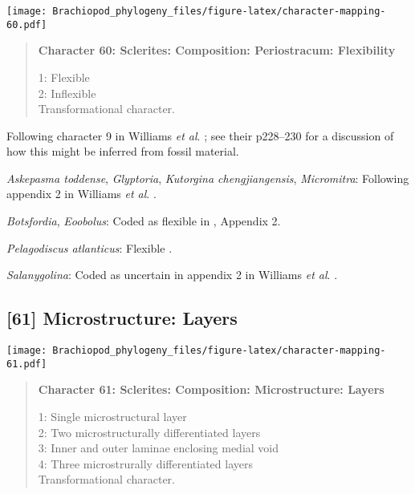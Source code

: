 \documentclass[openany]{book}
\theoremstyle{definition}
\theoremstyle{definition}
\theoremstyle{definition}
\theoremstyle{remark}
\begin{document}
\texttt{[image: Brachiopod\_phylogeny\_files/figure-latex/character-mapping-60.pdf]}

\begin{quote}
\textbf{Character 60: Sclerites: Composition: Periostracum: Flexibility}

1: Flexible\\
2: Inflexible\\
Transformational character.
\end{quote}

Following character 9 in Williams \emph{et al}.
\citeyearpar{Williams1998Thediversity}; see their p228--230 for a
discussion of how this might be inferred from fossil material.

\hypertarget{Askepasma_toddense-coding-60}{}
\emph{Askepasma toddense}, \emph{Glyptoria}, \emph{Kutorgina
chengjiangensis}, \emph{Micromitra}: Following appendix 2 in Williams
\emph{et al}. \citeyearpar{Williams1998Thediversity}.

\hypertarget{Botsfordia-coding-60}{}
\emph{Botsfordia}, \emph{Eoobolus}: Coded as flexible in
\citet{Williams1998Thediversity}, Appendix 2.

\hypertarget{Pelagodiscus_atlanticus-coding-60}{}
\emph{Pelagodiscus atlanticus}: Flexible
\citep{Williams1998Thediversity}.

\hypertarget{Salanygolina-coding-60}{}
\emph{Salanygolina}: Coded as uncertain in appendix 2 in Williams
\emph{et al}. \citeyearpar{Williams1998Thediversity}.

\subsection*{{[}61{]} Microstructure:
Layers}\label{microstructure-layers}

\texttt{[image: Brachiopod\_phylogeny\_files/figure-latex/character-mapping-61.pdf]}

\begin{quote}
\textbf{Character 61: Sclerites: Composition: Microstructure: Layers}

1: Single microstructural layer\\
2: Two microstructurally differentiated layers\\
3: Inner and outer laminae enclosing medial void\\
4: Three microstrurally differentiated layers\\
Transformational character.
\end{quote}
\end{document}
